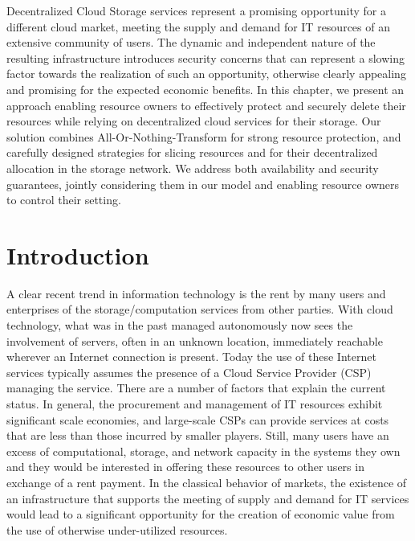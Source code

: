 Decentralized Cloud Storage services represent a promising opportunity
for a different cloud market, meeting the supply and demand for IT
resources of an extensive community of users.  The dynamic and
independent nature of the resulting infrastructure introduces security
concerns that can represent a slowing factor towards the realization
of such an opportunity, otherwise clearly appealing and promising for
the expected economic benefits.  In this chapter, we present an approach
enabling resource owners to effectively protect and securely delete
their resources while relying on decentralized cloud services for
their storage. Our solution combines All-Or-Nothing-Transform for
strong resource protection, and carefully designed strategies for
slicing resources and for their decentralized allocation in the
storage network.  We address both availability and security
guarantees, jointly considering them in our model and enabling
resource owners to control their setting.

\section{Introduction}

A clear recent trend in information technology is the rent by many
users and enterprises of the storage/computation services from other
parties. With cloud technology, what was in the past managed
autonomously now sees the involvement of servers, often in an unknown
location, immediately reachable wherever an Internet connection is
present.  Today the use of these Internet services typically assumes
the presence of a Cloud Service Provider (CSP) managing the service.
There are a number of factors that explain the current status. In
general, the procurement and management of IT resources exhibit
significant scale economies, and large-scale CSPs can provide services
at costs that are less than those incurred by smaller players. Still,
many users have an excess of computational, storage, and network
capacity in the systems they own and they would be interested in
offering these resources to other users in exchange of a rent
payment. In the classical behavior of markets, the existence of an
infrastructure that supports the meeting of supply and demand for IT
services would lead to a significant opportunity for the creation of
economic value from the use of otherwise under-utilized resources.


